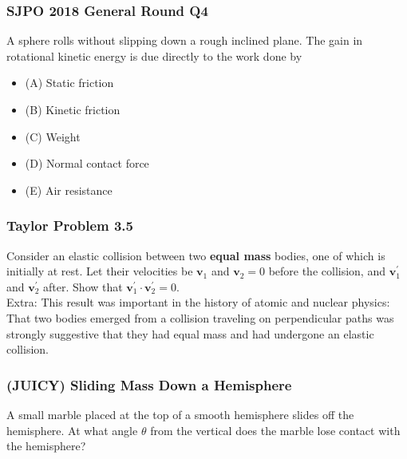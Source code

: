 \documentclass{article}
\begin{document}
\subsubsection{SJPO 2018 General Round Q4}
A sphere rolls without slipping down a rough inclined plane. The gain in rotational kinetic energy is due directly to the work done by
\begin{itemize}
\item[](A) Static friction
\item[](B) Kinetic friction
\item[](C) Weight
\item[](D) Normal contact force
\item[](E) Air resistance
\end{itemize}
\subsubsection{Taylor Problem 3.5}
Consider an elastic collision between two \textbf{equal mass} bodies, one of which is initially at rest. Let their velocities be $\mathbf{v}_1$ and $\mathbf{v}_2=0$ before the collision, and $\mathbf{v}_1^{\prime}$ and $\mathbf{v}_2^{\prime}$ after. Show that $\mathbf{v}_1^{\prime} \cdot \mathbf{v}_2^{\prime}=0$. \\[10pt]
Extra: This result was important in the history of atomic and nuclear physics: That two bodies emerged from a collision traveling on perpendicular paths was strongly suggestive that they had equal mass and had undergone an elastic collision.
\subsubsection{(JUICY) Sliding Mass Down a Hemisphere}
A small marble placed at the top of a smooth hemisphere slides off the hemisphere. At what angle $\theta$ from the vertical does the marble lose contact with the hemisphere?
\end{document}
